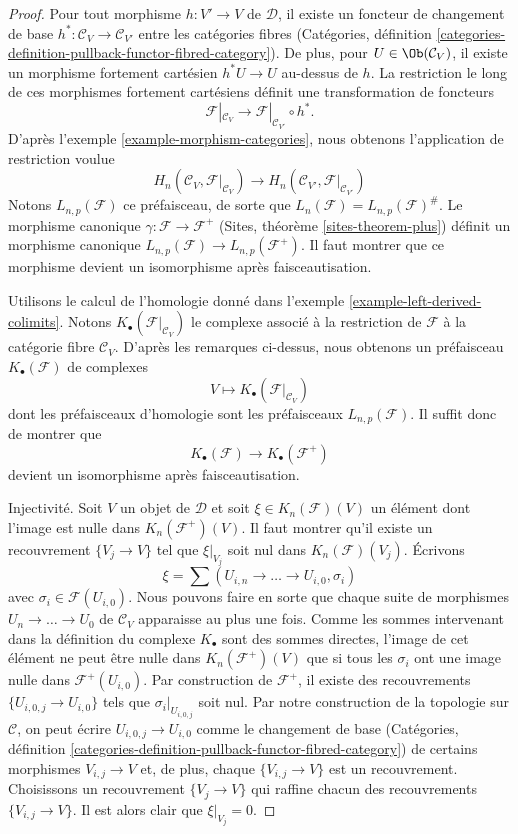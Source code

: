 \begin{proof}
Pour tout morphisme $h : V' \to V$ de $\mathcal{D}$, il existe un
foncteur de changement de base $h^* : \mathcal{C}_V \to \mathcal{C}_{V'}$ entre les
catégories fibres (Catégories, définition
\ref{categories-definition-pullback-functor-fibred-category}).
De plus, pour $U \in \Ob(\mathcal{C}_V)$, il existe un
morphisme fortement cartésien $h^*U \to U$ au-dessus de $h$.
La restriction le long de ces morphismes fortement cartésiens définit une
transformation de foncteurs
$$
\mathcal{F}|_{\mathcal{C}_V}
\longrightarrow
\mathcal{F}|_{\mathcal{C}_{V'}} \circ h^*.
$$
D'après l'exemple \ref{example-morphism-categories},
nous obtenons l'application de restriction voulue
$$
H_n(\mathcal{C}_V, \mathcal{F}|_{\mathcal{C}_V})
\longrightarrow
H_n(\mathcal{C}_{V'}, \mathcal{F}|_{\mathcal{C}_{V'}})
$$
Notons $L_{n, p}(\mathcal{F})$ ce préfaisceau, de sorte que
$L_n(\mathcal{F}) = L_{n, p}(\mathcal{F})^\#$.
Le morphisme canonique $\gamma : \mathcal{F} \to \mathcal{F}^+$
(Sites, théorème \ref{sites-theorem-plus})
définit un morphisme
canonique $L_{n, p}(\mathcal{F}) \to L_{n, p}(\mathcal{F}^+)$.
Il faut montrer que ce morphisme devient un isomorphisme après faisceautisation.

\medskip\noindent
Utilisons le calcul de l'homologie donné dans
l'exemple \ref{example-left-derived-colimits}. Notons
$K_\bullet(\mathcal{F}|_{\mathcal{C}_V})$ le complexe associé à
la restriction de $\mathcal{F}$ à la catégorie fibre $\mathcal{C}_V$.
D'après les remarques ci-dessus, nous obtenons un préfaisceau $K_\bullet(\mathcal{F})$
de complexes
$$
V \longmapsto K_\bullet(\mathcal{F}|_{\mathcal{C}_V})
$$
dont les préfaisceaux d'homologie sont les préfaisceaux $L_{n, p}(\mathcal{F})$.
Il suffit donc de montrer que
$$
K_\bullet(\mathcal{F}) \longrightarrow K_\bullet(\mathcal{F}^+)
$$
devient un isomorphisme après faisceautisation.

\medskip\noindent
Injectivité. Soit $V$ un objet de $\mathcal{D}$ et soit
$\xi \in K_n(\mathcal{F})(V)$ un élément dont l'image
est nulle dans $K_n(\mathcal{F}^+)(V)$. Il faut montrer qu'il existe un
recouvrement $\{V_j \to V\}$ tel que $\xi|_{V_j}$ soit nul dans
$K_n(\mathcal{F})(V_j)$. Écrivons
$$
\xi = \sum (U_{i, n} \to \ldots \to U_{i, 0}, \sigma_i)
$$
avec $\sigma_i \in \mathcal{F}(U_{i, 0})$. Nous pouvons faire en sorte que
chaque suite de morphismes $U_n \to \ldots \to U_0$ de $\mathcal{C}_V$
apparaisse au plus une fois. Comme les sommes intervenant dans la définition
du complexe $K_\bullet$ sont des sommes directes, l'image de cet élément ne peut
être nulle dans $K_n(\mathcal{F}^+)(V)$ que si tous les $\sigma_i$ ont une image
nulle dans $\mathcal{F}^+(U_{i, 0})$. Par construction de
$\mathcal{F}^+$, il existe des recouvrements $\{U_{i, 0, j} \to U_{i, 0}\}$
tels que $\sigma_i|_{U_{i, 0, j}}$ soit nul. Par notre construction de
la topologie sur $\mathcal{C}$, on peut écrire $U_{i, 0, j} \to U_{i, 0}$
comme le changement de base (Catégories, définition
\ref{categories-definition-pullback-functor-fibred-category})
de certains morphismes $V_{i, j} \to V$ et, de plus, chaque
$\{V_{i, j} \to V\}$ est un recouvrement. Choisissons un recouvrement
$\{V_j \to V\}$ qui raffine chacun des recouvrements $\{V_{i, j} \to V\}$.
Il est alors clair que $\xi|_{V_j} = 0$.


\end{proof}
